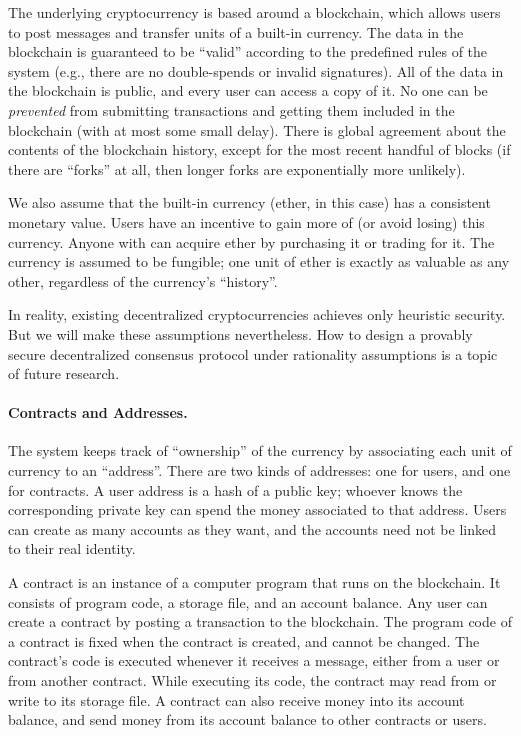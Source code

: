 \documentclass[12pt]{article}
\begin{document}
The underlying cryptocurrency is based around a blockchain,
which allows users to post messages and transfer units of a built-in currency.
The data in the blockchain is guaranteed to be ``valid'' according to the predefined rules of the system (e.g., there are no double-spends or invalid signatures).
All of the data in the blockchain is public, and every user can access a copy of it.
No one can be \emph{prevented} from submitting transactions and getting 
them included in the blockchain (with at most some small delay).
There is global agreement about the contents of the blockchain history, except for the most 
recent handful of blocks (if there are ``forks'' at all, then longer forks are exponentially more unlikely).

We also assume that the built-in currency (ether, in this case) has a consistent monetary value. Users have an incentive to gain more of (or avoid losing) this currency. Anyone with can acquire ether by purchasing it or trading for it. The currency is assumed to be fungible; one unit of ether is exactly as valuable as any other, regardless of the currency's ``history''.

In reality, existing decentralized cryptocurrencies
achieves only heuristic security. But we will make these assumptions
nevertheless. How to design a provably  
secure decentralized consensus protocol under
rationality assumptions is a topic of 
future research.

\paragraph{Contracts and Addresses.}
The system keeps track of ``ownership'' of the currency by associating each unit of currency to an ``address''. There are two kinds of addresses: one for users, and one for contracts. A user address is a hash of a public key; whoever knows the corresponding private key can spend the money associated to that address. Users can create as many accounts as they want, and the accounts need not be linked to their real identity.

A contract is an instance of a computer program that runs on the blockchain. It consists of program code, a storage file, and an account balance.
Any user can create a contract by posting a transaction to the blockchain.
The program code of a contract is fixed when the contract is created, and cannot be changed.
The contract's code is executed whenever it receives a message, either from a user or from another contract.
While executing its code, the contract may read from or write to its storage file.
A contract can also receive money into its account balance, and send money from its account balance to other contracts or users.
\end{document}
